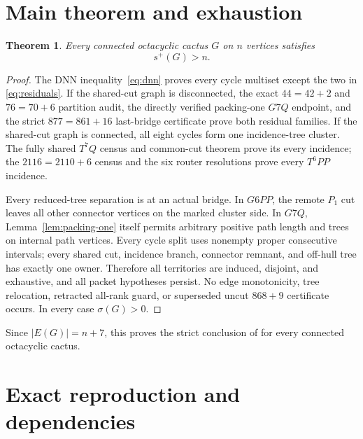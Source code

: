 \documentclass[11pt]{article}
\newtheorem{theorem}{Theorem}[section]
\newcommand{\spE}{s^+}
\newcommand{\sig}{\sigma}
\begin{document}
\section{Main theorem and exhaustion}

\begin{theorem}\label{thm:main}
Every connected octacyclic cactus $G$ on $n$ vertices satisfies
\[
 \boxed{\spE(G)>n}.
\]
\end{theorem}

\begin{proof}
The DNN inequality~\eqref{eq:dnn} proves every cycle multiset except the two in
\eqref{eq:residuals}.  If the shared-cut graph is disconnected, the exact
$44=42+2$ and $76=70+6$ partition audit, the directly verified packing-one
$G7Q$ endpoint, and the strict $877=861+16$ last-bridge certificate prove both
residual families.  If the shared-cut graph is connected, all eight cycles form
one incidence-tree cluster.  The fully shared $T^7Q$ census and common-cut
theorem prove its every incidence; the $2116=2110+6$ census and the six router
resolutions prove every $T^6PP$ incidence.

Every reduced-tree separation is at an actual bridge.  In $G6PP$, the remote
$P_1$ cut leaves all other connector vertices on the marked cluster side.  In
$G7Q$, Lemma~\ref{lem:packing-one} itself permits arbitrary positive path
length and trees on internal path vertices.  Every cycle split uses nonempty
proper consecutive intervals; every shared cut, incidence branch, connector
remnant, and off-hull tree has exactly one owner.  Therefore all territories
are induced, disjoint, and exhaustive, and all packet hypotheses persist.
No edge monotonicity, tree relocation, retracted all-rank guard, or superseded
uncut $868+9$ certificate occurs.  In every case $\sig(G)>0$.
\end{proof}

Since $|E(G)|=n+7$, this proves the strict conclusion of
\cite[Conjecture~1.2]{AKMPZ} for every connected octacyclic cactus.

\appendix
\section{Exact reproduction and dependencies}\label{app:reproduction}
\end{document}
